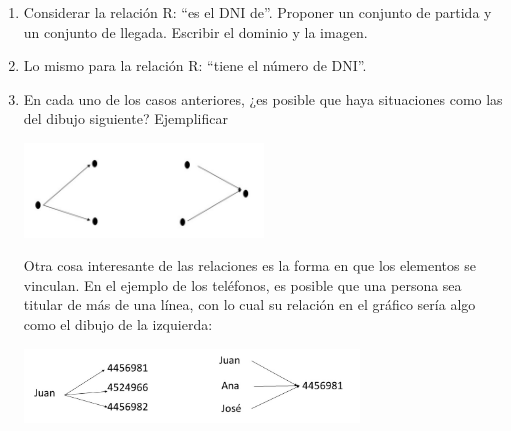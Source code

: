 \documentclass[12pt]{article}
\newtheorem*{myexample}{Ejemplo}
\theoremstyle{definition}
\begin{document}
\begin{enumerate}
\begin{myexample}
Tomemos el conjunto de las personas de Bariloche como conjunto de partida y números enteros positivos de siete cifras que empiezan con 4  (por ejemplo 4439821) como conjunto de llegada.  Consideremos la relación “$x$ (una persona) \textit{tiene como número de teléfono fijo al número} $y$ (número de siete cifras)” Seguramente habrá alguna persona que no tenga un teléfono fijo. El dominio entonces no coincide con el conjunto de partida, sino que estará constituido sólo por las personas que tienen teléfono fijo (cuál  número y cuántas líneas es otro cantar). También es cierto que no todo número de siete cifras empezado en 4 califica para número de teléfono. Más de una vez habremos llamado a alguien (y metido mal el dedo) y habremos escuchado a la chica de Telefónica que nos dice “el número solicitado no corresponde a un abonado en servicio”. Es decir, no todo número es el número de alguien. Es decir, dentro del conjunto de números enteros positivos de siete cifras que empiezan con 4, sólo algunos son efectivamente números de teléfonos de alguien. La imagen entonces no coincide con el conjunto de llegada, sino que estará constituida sólo por los números de siete cifras empezados con 4 que corresponden a un número de teléfono de alguna persona.
\end{myexample}

\item Considerar la relación R: “es el DNI de”. Proponer un conjunto de partida y un conjunto de llegada. Escribir el dominio y la imagen.

\item Lo mismo para la relación R: “tiene el número de DNI”.

\item En cada uno de los casos anteriores, ¿es posible que haya situaciones como las del dibujo siguiente? Ejemplificar
\begin{center} 
\includegraphics[width=0.5\textwidth]{tp2_fig1.jpg} 
\end{center}

Otra cosa interesante de las relaciones es la forma en que los elementos se vinculan. En el ejemplo de los teléfonos, es posible que una persona sea titular de más de una línea, con lo cual su relación en el gráfico sería algo como el dibujo de la izquierda:
\begin{center} 
\includegraphics[width=0.7\textwidth]{tp2_fig2.jpg} 
\end{center}


\end{enumerate}
\end{document}
